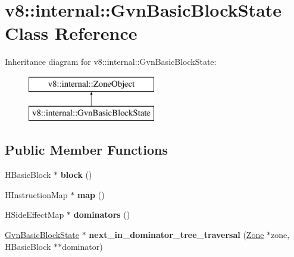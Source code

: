\hypertarget{classv8_1_1internal_1_1_gvn_basic_block_state}{}\section{v8\+:\+:internal\+:\+:Gvn\+Basic\+Block\+State Class Reference}
\label{classv8_1_1internal_1_1_gvn_basic_block_state}
Inheritance diagram for v8\+:\+:internal\+:\+:Gvn\+Basic\+Block\+State\+:\begin{figure}[H]
\begin{center}
\leavevmode
\includegraphics[height=2.000000cm]{classv8_1_1internal_1_1_gvn_basic_block_state}
\end{center}
\end{figure}
\subsection*{Public Member Functions}
\begin{DoxyCompactItemize}
\item 
\hypertarget{classv8_1_1internal_1_1_gvn_basic_block_state_af243d97cb1c2d7f39c0dcce5a404a101}{}H\+Basic\+Block $\ast$ {\bfseries block} ()\label{classv8_1_1internal_1_1_gvn_basic_block_state_af243d97cb1c2d7f39c0dcce5a404a101}

\item 
\hypertarget{classv8_1_1internal_1_1_gvn_basic_block_state_a6f5961f87371e7727d95e30b14fb338b}{}H\+Instruction\+Map $\ast$ {\bfseries map} ()\label{classv8_1_1internal_1_1_gvn_basic_block_state_a6f5961f87371e7727d95e30b14fb338b}

\item 
\hypertarget{classv8_1_1internal_1_1_gvn_basic_block_state_a28a43fe653ea405cc2493748b8db3b33}{}H\+Side\+Effect\+Map $\ast$ {\bfseries dominators} ()\label{classv8_1_1internal_1_1_gvn_basic_block_state_a28a43fe653ea405cc2493748b8db3b33}

\item 
\hypertarget{classv8_1_1internal_1_1_gvn_basic_block_state_a4a094a126cafa4189acd01cdc3119fcb}{}\hyperlink{classv8_1_1internal_1_1_gvn_basic_block_state}{Gvn\+Basic\+Block\+State} $\ast$ {\bfseries next\+\_\+in\+\_\+dominator\+\_\+tree\+\_\+traversal} (\hyperlink{classv8_1_1internal_1_1_zone}{Zone} $\ast$zone, H\+Basic\+Block $\ast$$\ast$dominator)\label{classv8_1_1internal_1_1_gvn_basic_block_state_a4a094a126cafa4189acd01cdc3119fcb}

\end{DoxyCompactItemize}
